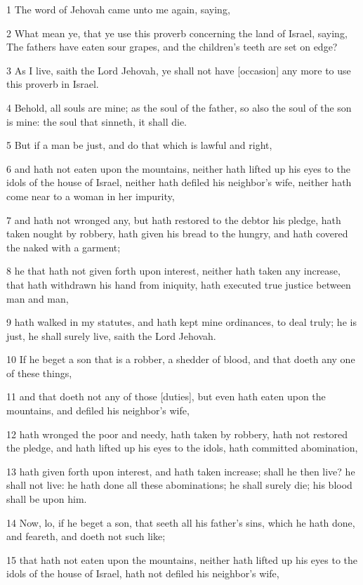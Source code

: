 \par 1 The word of Jehovah came unto me again, saying,
\par 2 What mean ye, that ye use this proverb concerning the land of Israel, saying, The fathers have eaten sour grapes, and the children's teeth are set on edge?
\par 3 As I live, saith the Lord Jehovah, ye shall not have [occasion] any more to use this proverb in Israel.
\par 4 Behold, all souls are mine; as the soul of the father, so also the soul of the son is mine: the soul that sinneth, it shall die.
\par 5 But if a man be just, and do that which is lawful and right,
\par 6 and hath not eaten upon the mountains, neither hath lifted up his eyes to the idols of the house of Israel, neither hath defiled his neighbor's wife, neither hath come near to a woman in her impurity,
\par 7 and hath not wronged any, but hath restored to the debtor his pledge, hath taken nought by robbery, hath given his bread to the hungry, and hath covered the naked with a garment;
\par 8 he that hath not given forth upon interest, neither hath taken any increase, that hath withdrawn his hand from iniquity, hath executed true justice between man and man,
\par 9 hath walked in my statutes, and hath kept mine ordinances, to deal truly; he is just, he shall surely live, saith the Lord Jehovah.
\par 10 If he beget a son that is a robber, a shedder of blood, and that doeth any one of these things,
\par 11 and that doeth not any of those [duties], but even hath eaten upon the mountains, and defiled his neighbor's wife,
\par 12 hath wronged the poor and needy, hath taken by robbery, hath not restored the pledge, and hath lifted up his eyes to the idols, hath committed abomination,
\par 13 hath given forth upon interest, and hath taken increase; shall he then live? he shall not live: he hath done all these abominations; he shall surely die; his blood shall be upon him.
\par 14 Now, lo, if he beget a son, that seeth all his father's sins, which he hath done, and feareth, and doeth not such like;
\par 15 that hath not eaten upon the mountains, neither hath lifted up his eyes to the idols of the house of Israel, hath not defiled his neighbor's wife,
